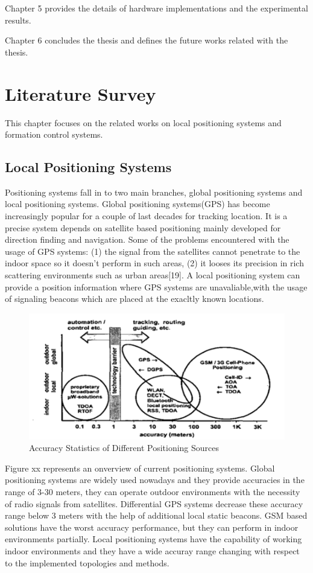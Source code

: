 \documentclass[twoside]{article}
\begin{document}
Chapter 5 provides the details of hardware implementations and the experimental results.

Chapter 6 concludes the thesis and defines the future works related with the thesis.


\section{Literature Survey}
This chapter focuses on the related works on local positioning systems and formation control systems. 

\subsection{Local Positioning Systems}

Positioning systems fall in to two main branches, global positioning systems and local positioning systems. Global positioning systems(GPS) has become increasingly popular for a couple of last decades for tracking location. It is a precise system depends on satellite based positioning mainly developed for direction finding and navigation.  Some of the problems encountered with the usage of GPS systems: (1) the signal from the satellites cannot penetrate to the indoor space so it doesn't perform in such areas, (2) it looses its precision in rich scattering environments such as urban areas[19].  A local positioning system can provide a position information where GPS systems are unavaliable,with the usage of signaling beacons which are placed at the exacltly known locations.




\begin{figure}[H]
	\caption{Accuracy Statistics of Different Positioning Sources}
	\centering
	\includegraphics[scale = 1]{gps}
\end{figure} 

Figure xx represents an onverview of current positioning systems. Global positioning systems are widely used nowadays and they provide accuracies in the range of 3-30 meters, they can operate outdoor environments with the necessity of radio signals from satellites. Differential GPS systems decrease these accuracy range below 3 meters with the help of additional local static beacons. GSM based solutions have the worst accuracy performance, but they can perform in indoor environments partially.  Local positioning systems have the capability of working indoor environments and they have a wide accuray range changing with respect to the implemented topologies and methods. 
\end{document}
